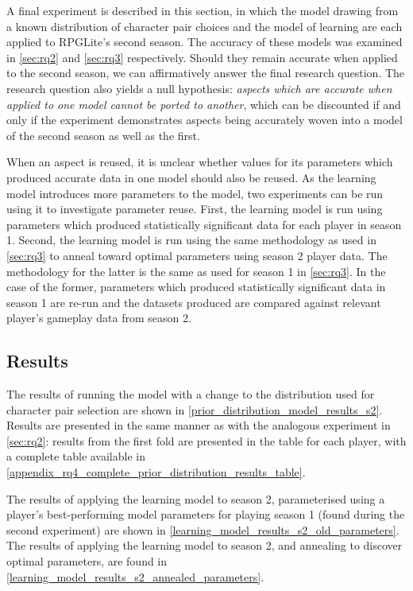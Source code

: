 A final experiment is described in this section, in which the model drawing from
a known distribution of character pair choices and the model of learning are
each applied to RPGLite's second season. The accuracy of these models was
examined in \cref{sec:rq2} and \cref{sec:rq3} respectively. Should they remain
accurate when applied to the second season, we can affirmatively answer the
final research question. The research question also yields a null hypothesis:
\emph{aspects which are accurate when applied to one model cannot be ported to
another}, which can be discounted if and only if the experiment
demonstrates aspects being accurately woven into a model of the second season as
well as the first. 

When an aspect is reused, it is unclear whether values for its parameters which
produced accurate data in one model should also be reused. As the learning model
introduces more parameters to the model, two experiments can be run using it to
investigate parameter reuse. First, the learning model is run using parameters
which produced statistically significant data for each player in season 1.
Second, the learning model is run using the same methodology as used in
\cref{sec:rq3} to anneal toward optimal parameters using season 2 player data.
The methodology for the latter is the same as used for season 1 in
\cref{sec:rq3}. In the case of the former, parameters which produced
statistically significant data in season 1 are re-run and the datasets produced
are compared against relevant player's gameplay data from season 2.


\subsection{Results}

The results of running the model with a change to the distribution used for
character pair selection are shown in
\cref{prior_distribution_model_results_s2}. Results are presented in the same
manner as with the analogous experiment in \cref{sec:rq2}: results from the
first fold are presented in the table for
each player, with a complete table available in
\cref{appendix_rq4_complete_prior_distribution_results_table}.

The results of applying the learning
model to season 2, parameterised using a player's best-performing model
parameters for playing season 1 (found during the second experiment) are shown
in \cref{learning_model_results_s2_old_parameters}. The results of applying the
learning model to season 2, and annealing to discover optimal parameters, are
found in \cref{learning_model_results_s2_annealed_parameters}.

